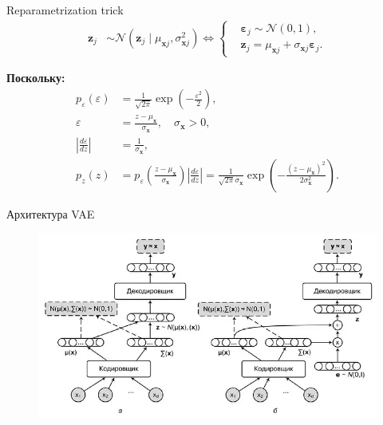 \begin{frame}{Reparametrization trick}
    \begin{align*}
        \boldsymbol{z}_j &\sim \boldsymbol{\mathcal{N}}( \boldsymbol{z}_j \mid \mu_{\boldsymbol{x}j}, \sigma_{\boldsymbol{x}j}^2) \Leftrightarrow
        \begin{cases}
            & \boldsymbol{\varepsilon}_j \sim \boldsymbol{\mathcal{N}}(0, 1), \\
            & \boldsymbol{z}_j = \mu_{\boldsymbol{x}j} + \sigma_{\boldsymbol{x}j}\boldsymbol{\varepsilon}_j.
        \end{cases}
    \end{align*}

    \textbf{Поскольку:}
    \begin{align*}
        p_{\varepsilon}(\varepsilon) &= \frac{1}{\sqrt{2\pi}}\exp\left(-\frac{\varepsilon^2}{2}\right), \\
        \varepsilon &= \frac{z - \mu_{\boldsymbol{x}}}{\sigma_{\boldsymbol{x}}}, \quad \sigma_{\boldsymbol{x}} > 0, \\
        \left|\frac{d\varepsilon}{dz}\right| &= \frac{1}{\sigma_{\boldsymbol{x}}}, \\
        p_z(z) &= p_{\varepsilon}\left(\frac{z - \mu_{\boldsymbol{x}}}{\sigma_{\boldsymbol{x}}}\right)\left|\frac{d\varepsilon}{dz}\right| = \frac{1}{\sqrt{2\pi}\sigma_{\boldsymbol{x}}}\exp\left(-\frac{(z - \mu_{\boldsymbol{x}})^2}{2\sigma_{\boldsymbol{x}}^2}\right).
    \end{align*}
\end{frame}

\begin{frame}{Архитектура VAE}
    \begin{figure}
        \centering
        \includegraphics[width=1\textwidth]{../resources/vae/vae.png}
    \end{figure}
\end{frame}

